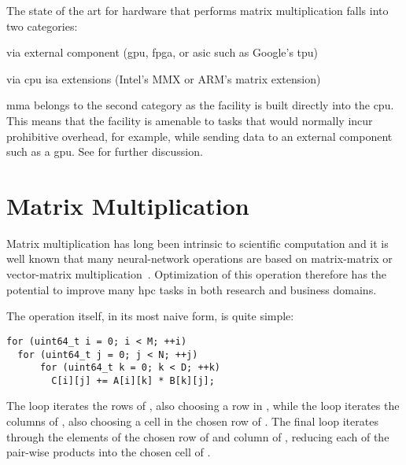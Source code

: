 \documentclass[\main/thesis.tex]{subfiles}
\begin{document}
The state of the art for hardware that performs matrix multiplication falls into two categories:
\begin{enumerate*}[itemjoin*={{ and }}, label=\textbf{(\arabic*)}, after={.}]
  \item via external component (\eg \gls{gpu}, \gls{fpga}, or \gls{asic} such as Google's \gls{tpu})
  \item via \gls{cpu} \gls{isa} extensions (\eg Intel's MMX or ARM's matrix extension)
\end{enumerate*}
\Gls{mma} belongs to the second category as the facility is built directly into the \gls{cpu}.
This means that the facility is amenable to tasks that would normally incur prohibitive overhead, for example, while sending data to an external component such as a \gls{gpu}.
See  for further discussion.

\section{Matrix Multiplication}
Matrix multiplication has long been intrinsic to scientific computation and it is well known that many neural-network operations are based on matrix-matrix or vector-matrix multiplication~\autocite{rojas1996neural,blue1992training}.
Optimization of this operation therefore has the potential to improve many \gls{hpc} tasks in both research and business domains.

The operation itself, in its most naive form, is quite simple:
\begin{lstlisting}[caption={[Basic Matrix Multiplication]A basic matrix multiplication.},label=lst:basicmatmul]
for (uint64_t i = 0; i < M; ++i)
  for (uint64_t j = 0; j < N; ++j)
      for (uint64_t k = 0; k < D; ++k)
        C[i][j] += A[i][k] * B[k][j];
\end{lstlisting}
The  loop iterates the rows of , also choosing a row in , while the  loop iterates the columns of , also choosing a cell in the chosen row of .
The final  loop iterates through the elements of the chosen row of  and column of , reducing each of the pair-wise products into the chosen cell of .
\end{document}
